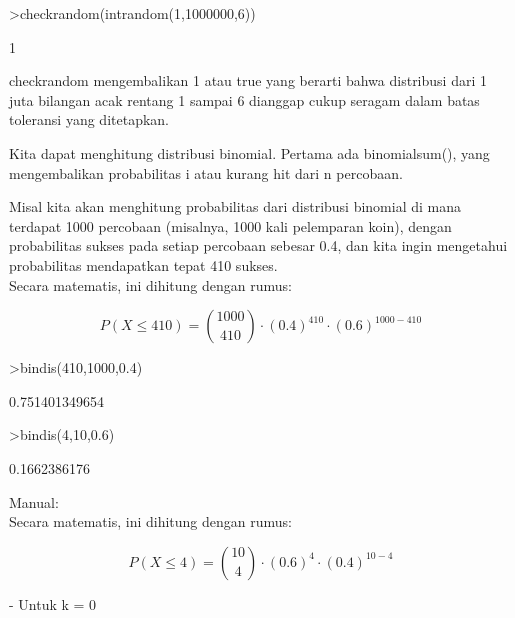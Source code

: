 \documentclass[a4paper,10pt]{article}
\begin{document}
\begin{eulernotebook}
\begin{eulercomment}
\begin{eulercomment}
\begin{eulercomment}
\end{eulercomment}
\begin{eulerprompt}
>checkrandom(intrandom(1,1000000,6))
\end{eulerprompt}
\begin{euleroutput}
  1
\end{euleroutput}
\begin{eulercomment}
checkrandom mengembalikan 1 atau true yang berarti bahwa distribusi
dari 1 juta bilangan acak rentang 1 sampai 6 dianggap cukup seragam
dalam batas toleransi yang ditetapkan.

Kita dapat menghitung distribusi binomial. Pertama ada binomialsum(),
yang mengembalikan probabilitas i atau kurang hit dari n percobaan.

Misal kita akan menghitung probabilitas dari distribusi binomial di
mana terdapat 1000 percobaan (misalnya, 1000 kali pelemparan koin),
dengan probabilitas sukses pada setiap percobaan sebesar 0.4, dan kita
ingin mengetahui probabilitas mendapatkan tepat 410 sukses.\\
Secara matematis, ini dihitung dengan rumus:\\
\end{eulercomment}
\begin{eulerformula}
\[
P(X \leq 410)= \binom{1000}{410} \cdot (0.4)^{410} \cdot (0.6)^{1000-410}
\]
\end{eulerformula}
\begin{eulerprompt}
>bindis(410,1000,0.4)
\end{eulerprompt}
\begin{euleroutput}
  0.751401349654
\end{euleroutput}
\begin{eulerprompt}
>bindis(4,10,0.6)
\end{eulerprompt}
\begin{euleroutput}
  0.1662386176
\end{euleroutput}
\begin{eulercomment}
Manual:\\
Secara matematis, ini dihitung dengan rumus:\\
\end{eulercomment}
\begin{eulerformula}
\[
P(X \leq 4)= \binom{10}{4} \cdot (0.6)^{4} \cdot (0.4)^{10-4}
\]
\end{eulerformula}
\begin{eulercomment}
- Untuk k = 0\\
\end{eulercomment}

\end{eulercomment}
\end{eulercomment}
\end{eulernotebook}
\end{document}
